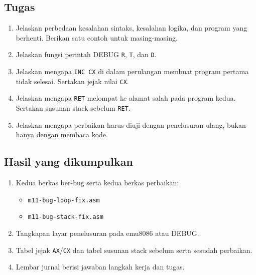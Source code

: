 \subsection{Tugas}

\begin{enumerate}
    \item Jelaskan perbedaan kesalahan sintaks, kesalahan logika, dan
          program yang berhenti. Berikan satu contoh untuk
          masing-masing.
    \item Jelaskan fungsi perintah DEBUG \texttt{R}, \texttt{T}, dan
          \texttt{D}.
    \item Jelaskan mengapa \texttt{INC CX} di dalam perulangan membuat
          program pertama tidak selesai. Sertakan jejak nilai
          \texttt{CX}.
    \item Jelaskan mengapa \texttt{RET} melompat ke alamat salah pada
          program kedua. Sertakan susunan stack sebelum \texttt{RET}.
    \item Jelaskan mengapa perbaikan harus diuji dengan penelusuran
          ulang, bukan hanya dengan membaca kode.
\end{enumerate}

\subsection{Hasil yang dikumpulkan}

\begin{enumerate}
    \item Kedua berkas ber-bug serta kedua berkas perbaikan:
          \begin{itemize}
              \item \texttt{m11-bug-loop-fix.asm}
              \item \texttt{m11-bug-stack-fix.asm}
          \end{itemize}
    \item Tangkapan layar penelusuran pada emu8086 atau DEBUG.
    \item Tabel jejak \texttt{AX}/\texttt{CX} dan tabel susunan stack
          sebelum serta sesudah perbaikan.
    \item Lembar jurnal berisi jawaban langkah kerja dan tugas.
\end{enumerate}
